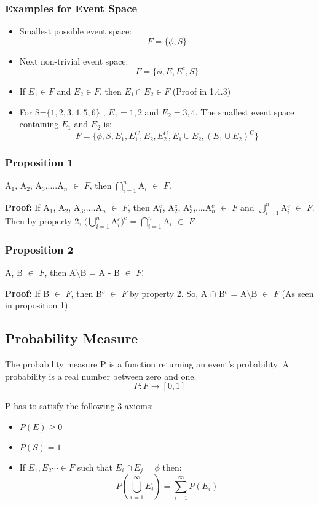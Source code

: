 \documentclass{article}
\begin{document}
\subsubsection{Examples for Event Space}
\begin{itemize}
    \item Smallest possible event space:
    $$ F =\{ \phi,S\} $$
    \item Next non-trivial event space:
    $$ F=\{ \phi,E ,E^c ,S\}$$
    \item If $E_1 \in F$ and $E_2 \in F$, then $E_1 \cap E_2 \in F$ (Proof in 1.4.3)
    \item For S=$\{1,2,3,4,5,6\}$ , $E_1 ={1,2}$ and $E_2={3,4}$. The smallest event space containing $E_1$ and $E_2$ is:
    $$ F=\{\phi , S, E_1 , E_{1}^{C},E_2 , E_{2}^{C},E_1 \cup E_2 , (E_{1} \cup E_{2})^{C}\}$$
\end{itemize}

\subsubsection{Proposition 1}
A$_1$, A$_2$, A$_3$,....A$_n$ $\in$ $F$, then $\bigcap\limits_{i=1}^n$A$_i$ $\in$ $F$.

\textbf{Proof: }If A$_1$, A$_2$, A$_3$,....A$_n$ $\in$ $F$, then A$_1^c$, A$_2^c$, A$_3^c$,....A$_n^c$ $\in$ $F$ and $\bigcup\limits_{i=1}^n$A$_i^c$ $\in$ $F$. Then by property 2, $(\bigcup\limits_{i=1}^n$A$_i^c)^c$ = $\bigcap\limits_{i=1}^n$A$_i$ $\in$ $F$.

\subsubsection{Proposition 2}
A, B $\in$ $F$, then A$\setminus$B = A - B $\in$ $F$.\medskip

\textbf{Proof: }If B $\in$ $F$, then B$^c$ $\in$ $F$ by  property 2. So, A $\cap$ B$^c$ = A$\setminus$B $\in$ $F$ (As seen in proposition 1).

\subsection{Probability Measure}
The probability measure P is a function returning an event's probability. A probability is a real number between zero and one.
$$ P:F\rightarrow [0,1]$$

P has to satisfy the following 3 axioms:
\begin{itemize}
    \item $P(E) \geq 0$
    \item $P(S)=1$
    \item If $E_1,E_2 \cdots \in F$ such that $E_i \cap E_j =\phi$ then:
    $$ P(\bigcup_{i=1}^{\infty} E_{i})= \sum_{i=1}^{\infty} P(E_i)$$
\end{itemize}
\end{document}

